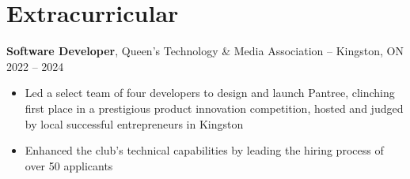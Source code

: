 

\section*{Extracurricular}
\textbf{Software Developer}, {Queen's Technology \& Media Association} -- Kingston, ON \hfill 2022 -- 2024 \\
\vspace{-5pt}
\begin{itemize}
  \item Led a select team of four developers to design and launch Pantree, clinching first place in a prestigious product innovation competition, hosted and judged by local successful entrepreneurs in Kingston
  \item Enhanced the club's technical capabilities by leading the hiring process of over 50 applicants
\end{itemize}

